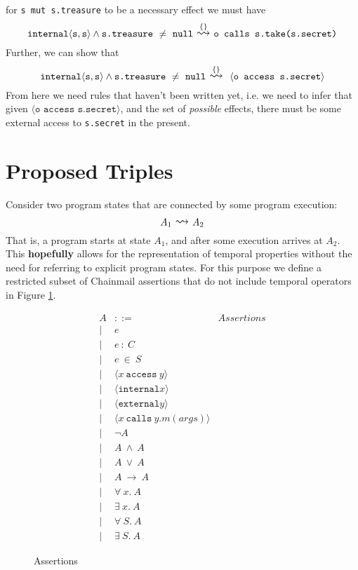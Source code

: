 \documentclass[12pt]{article}
\newcommand\trans[1]{\overset{#1}{\mathlarger{\mathlarger \leadsto}}}
\begin{document}
for \texttt{s mut s.treasure} to be a necessary effect we must have 
$$\texttt{internal}\langle \texttt{s}, \texttt{s} \rangle \wedge \texttt{s.treasure}\ \neq\ \texttt{null}\ \trans{\{\}} \ \texttt{o calls s.take(s.secret)}$$
Further, we can show that 
$$\texttt{internal}\langle \texttt{s}, \texttt{s} \rangle \wedge \texttt{s.treasure}\ \neq\ \texttt{null}\ \trans{\{\}}\ \ \langle\texttt{o access s.secret}\rangle$$
From here we need rules that haven't been written yet, i.e. we need to infer that given $\langle\texttt{o access s.secret}\rangle$, and the set of 
\emph{possible} effects, there must be some external access to \texttt{s.secret} in the present.

\newpage

\section{Proposed Triples}

Consider two program states that are connected by some program execution:
$$A_1\ \trans{}\ A_2$$
That is, a program starts at state $A_1$, and after some execution arrives at
$A_2$. This \textbf{hopefully} allows for the representation of temporal properties without the 
need for referring to explicit program states.
For this purpose we define a restricted subset of Chainmail assertions that
do not include temporal operators in Figure \ref{f:assertions_triple}.
	
	\begin{figure}[h]
	\[
	\begin{array}{llr}
	A & ::= & \textit{Assertions}\\  
	| & e & \\
	| & e\ :\ C & \\
	| & e\ \in\ S & \\
	| & \langle x\ \texttt{access}\ y \rangle &\\
	| & \langle \texttt{internal}x \rangle &\\
	| & \langle \texttt{external}y \rangle &\\
	| & \langle x\ \texttt{calls}\ y.m(args)\rangle & \\
	| & \neg A & \\
	| & A\ \wedge\ A & \\
	| & A\ \vee\ A & \\
	| & A\ \longrightarrow\ A & \\
	| & \forall\ x.\ A & \\
	| & \exists\ x.\ A & \\
	| & \forall\ S.\ A & \\
	| & \exists\ S.\ A &
	\end{array}
	\]
	\caption{Assertions}
	\label{f:assertions_triple}
	\end{figure}
	
\end{document}

